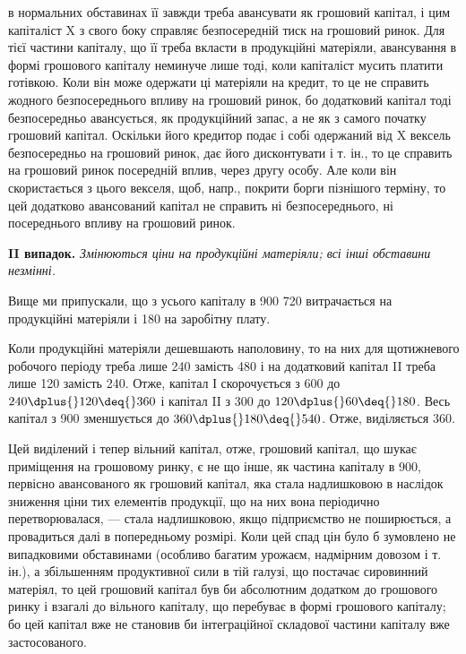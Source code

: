 \parcont{}  %
в нормальних обставинах її завжди треба авансувати як грошовий капітал,
і цим капіталіст X з свого боку справляє безпосередній тиск на грошовий
ринок. Для тієї частини капіталу, що її треба вкласти в продукційні
матеріяли, авансування в формі грошового капіталу неминуче лише
тоді, коли капіталіст мусить платити готівкою. Коли він може одержати
ці матеріяли на кредит, то це не справить жодного безпосереднього
впливу на грошовий ринок, бо додатковий капітал тоді безпосередньо
авансується, як продукційний запас, а не як з самого початку грошовий
капітал. Оскільки його кредитор подає і собі одержаний від X вексель
безпосередньо на грошовий ринок, дає його дисконтувати і т. ін., то це
справить на грошовий ринок посередній вплив, через другу особу. Але
коли він скористається з цього векселя, щоб, напр., покрити борги пізнішого
терміну, то цей додатково авансований капітал не справить ні
безпосереднього, ні посереднього впливу на грошовий ринок.

\textbf{II випадок.} \emph{Змінюються ціни на продукційні матеріяли; всі інші
обставини незмінні.}

Вище ми припускали, що з усього капіталу в 900  \deq{} 720 витрачається на продукційні матеріяли і  \deq{} 180 на заробітну
плату.

Коли продукційні матеріяли дешевшають наполовину, то на них для
щотижневого робочого періоду треба лише 240 замість 480 і на додатковий капітал II треба лише 120 замість
240. Отже, капітал І скорочується з 600 до $240 \dplus{}
120 \deq{} 360$ і капітал II з 300 до $120 \dplus{} 60 \deq{} 180$. Весь капітал з 900 зменшується до $360 \dplus{} 180 \deq{} 540$. Отже, виділяється 360.

Цей виділений і тепер вільний капітал, отже, грошовий капітал, що
шукає приміщення на грошовому ринку, є не що інше, як частина капіталу
в 900, первісно авансованого як грошовий капітал, яка
стала надлишковою в наслідок зниження ціни тих елементів продукції,
що на них вона періодично перетворювалася, — стала надлишковою,
якщо підприємство не поширюється, а провадиться далі в попередньому
розмірі. Коли цей спад цін було б зумовлено не випадковими обставинами
(особливо багатим урожаєм, надмірним довозом і т. ін.), а збільшенням
продуктивної сили в тій галузі, що постачає сировинний матеріял,
то цей грошовий капітал був би абсолютним додатком до грошового
ринку і взагалі до вільного капіталу, що перебуває в формі грошового
капіталу; бо цей капітал вже не становив би інтеграційної складової частини
капіталу вже застосованого.

